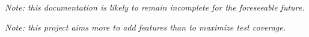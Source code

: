 {\em \small Note: this documentation is likely to remain incomplete
for the foreseeable future.}

\noindent
{\em \small Note: this project aims more to add features than to maximize
test coverage.}
